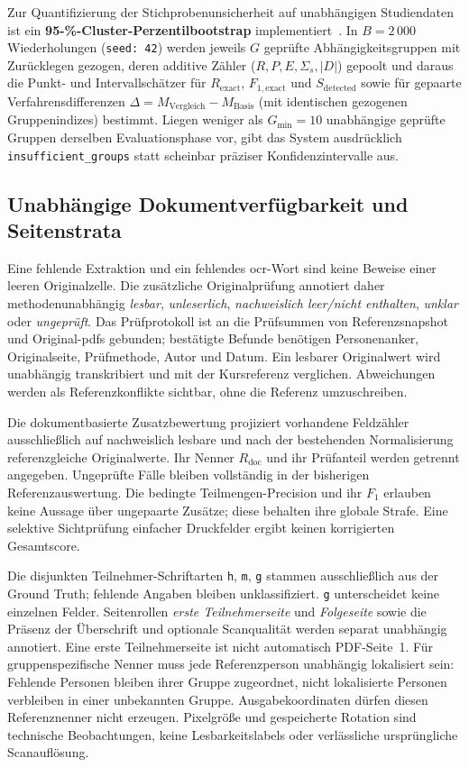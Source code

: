 Zur Quantifizierung der Stichprobenunsicherheit auf unabhängigen Studiendaten ist ein \textbf{95-\%-Cluster-Perzentilbootstrap} implementiert~\cite{Field2007Cluster,SciPyBootstrapDocumentation}. In $B = 2\,000$ Wiederholungen (\texttt{seed: 42}) werden jeweils $G$ geprüfte Abhängigkeitsgruppen mit Zurücklegen gezogen, deren additive Zähler ($R, P, E, \Sigma_s, |D|$) gepoolt und daraus die Punkt- und Intervallschätzer für $R_{\mathrm{exact}}$, $F_{1,\mathrm{exact}}$ und $S_{\mathrm{detected}}$ sowie für gepaarte Verfahrensdifferenzen $\Delta = M_{\text{Vergleich}} - M_{\text{Basis}}$ (mit identischen gezogenen Gruppenindizes) bestimmt. Liegen weniger als $G_{\min} = 10$ unabhängige geprüfte Gruppen derselben Evaluationsphase vor, gibt das System ausdrücklich \texttt{insufficient\_groups} statt scheinbar präziser Konfidenzintervalle aus.

\subsection{Unabhängige Dokumentverfügbarkeit und Seitenstrata}
\label{subsec:dokumentverfuegbarkeit}

Eine fehlende Extraktion und ein fehlendes \ac{ocr}-Wort sind keine Beweise einer leeren Originalzelle. Die zusätzliche Originalprüfung annotiert daher methodenunabhängig \emph{lesbar}, \emph{unleserlich}, \emph{nachweislich leer/nicht enthalten}, \emph{unklar} oder \emph{ungeprüft}. Das Prüfprotokoll ist an die Prüfsummen von Referenzsnapshot und Original-\acp{pdf} gebunden; bestätigte Befunde benötigen Personenanker, Originalseite, Prüfmethode, Autor und Datum. Ein lesbarer Originalwert wird unabhängig transkribiert und mit der Kursreferenz verglichen. Abweichungen werden als Referenzkonflikte sichtbar, ohne die Referenz umzuschreiben.

Die dokumentbasierte Zusatzbewertung projiziert vorhandene Feldzähler ausschließlich auf nachweislich lesbare und nach der bestehenden Normalisierung referenzgleiche Originalwerte. Ihr Nenner $R_{\mathrm{doc}}$ und ihr Prüfanteil werden getrennt angegeben. Ungeprüfte Fälle bleiben vollständig in der bisherigen Referenzauswertung. Die bedingte Teilmengen-Precision und ihr $F_1$ erlauben keine Aussage über ungepaarte Zusätze; diese behalten ihre globale Strafe. Eine selektive Sichtprüfung einfacher Druckfelder ergibt keinen korrigierten Gesamtscore.

Die disjunkten Teilnehmer-Schriftarten \texttt{h}, \texttt{m}, \texttt{g} stammen ausschließlich aus der Ground Truth; fehlende Angaben bleiben unklassifiziert. \texttt{g} unterscheidet keine einzelnen Felder. Seitenrollen \emph{erste Teilnehmerseite} und \emph{Folgeseite} sowie die Präsenz der Überschrift und optionale Scanqualität werden separat unabhängig annotiert. Eine erste Teilnehmerseite ist nicht automatisch PDF-Seite~1. Für gruppenspezifische Nenner muss jede Referenzperson unabhängig lokalisiert sein: Fehlende Personen bleiben ihrer Gruppe zugeordnet, nicht lokalisierte Personen verbleiben in einer unbekannten Gruppe. Ausgabekoordinaten dürfen diesen Referenznenner nicht erzeugen. Pixelgröße und gespeicherte Rotation sind technische Beobachtungen, keine Lesbarkeitslabels oder verlässliche ursprüngliche Scanauflösung.


